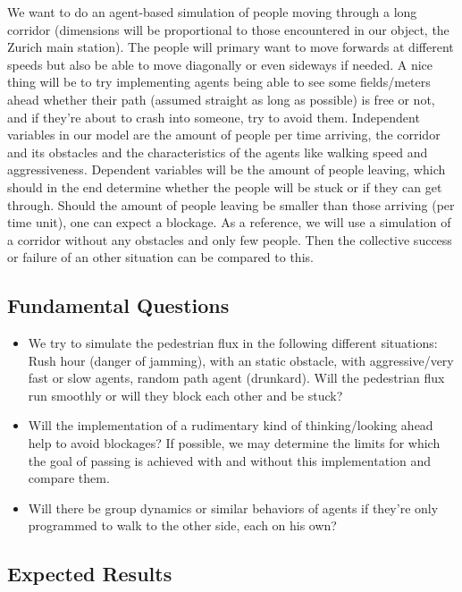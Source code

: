 We want to do an agent-based simulation of people moving through a long corridor (dimensions will be proportional to those encountered in our object, the Zurich main station). The people will primary want to move forwards at different speeds but also be able to move diagonally or even sideways if needed. A nice thing will be to try implementing agents being able to see some fields/meters ahead whether their path (assumed straight as long as possible) is free or not, and if they're about to crash into someone, try to avoid them. Independent variables in our model are the amount of people per time arriving, the corridor and its obstacles and the characteristics of the agents like walking speed and aggressiveness. Dependent variables will be the amount of people leaving, which should in the end determine whether the people will be stuck or if they can get through. Should the amount of people leaving be smaller than those arriving (per time unit), one can expect a blockage. As a reference, we will use a simulation of a corridor without any obstacles and only few people. Then the collective success or failure of an other situation can be compared to this.

\subsection*{Fundamental Questions}

\begin{itemize}
 \item We try to simulate the pedestrian flux in the following different situations: Rush hour (danger of jamming), with an static obstacle, with aggressive/very fast or slow agents, random path agent (drunkard). Will the pedestrian flux run smoothly or will they block each other and be stuck?
 \item Will the implementation of a rudimentary kind of thinking/looking ahead help to avoid blockages? If possible, we may determine the limits for which the goal of passing is achieved with and without this implementation and compare them.
 \item Will there be group dynamics or similar behaviors of agents if they're only programmed to walk to the other side, each on his own?
\end{itemize}
 
\subsection*{Expected Results}

